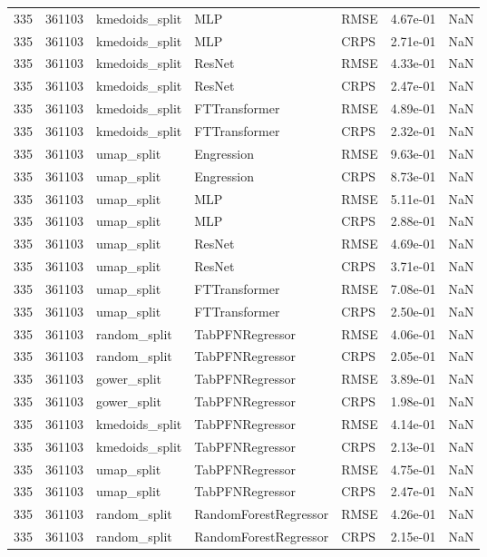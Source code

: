 \begin{tabular}{rrlllrr}
335 & 361103 & kmedoids\_split & MLP & RMSE & 4.67e-01 & NaN \\
335 & 361103 & kmedoids\_split & MLP & CRPS & 2.71e-01 & NaN \\
335 & 361103 & kmedoids\_split & ResNet & RMSE & 4.33e-01 & NaN \\
335 & 361103 & kmedoids\_split & ResNet & CRPS & 2.47e-01 & NaN \\
335 & 361103 & kmedoids\_split & FTTransformer & RMSE & 4.89e-01 & NaN \\
335 & 361103 & kmedoids\_split & FTTransformer & CRPS & 2.32e-01 & NaN \\
335 & 361103 & umap\_split & Engression & RMSE & 9.63e-01 & NaN \\
335 & 361103 & umap\_split & Engression & CRPS & 8.73e-01 & NaN \\
335 & 361103 & umap\_split & MLP & RMSE & 5.11e-01 & NaN \\
335 & 361103 & umap\_split & MLP & CRPS & 2.88e-01 & NaN \\
335 & 361103 & umap\_split & ResNet & RMSE & 4.69e-01 & NaN \\
335 & 361103 & umap\_split & ResNet & CRPS & 3.71e-01 & NaN \\
335 & 361103 & umap\_split & FTTransformer & RMSE & 7.08e-01 & NaN \\
335 & 361103 & umap\_split & FTTransformer & CRPS & 2.50e-01 & NaN \\
335 & 361103 & random\_split & TabPFNRegressor & RMSE & 4.06e-01 & NaN \\
335 & 361103 & random\_split & TabPFNRegressor & CRPS & 2.05e-01 & NaN \\
335 & 361103 & gower\_split & TabPFNRegressor & RMSE & 3.89e-01 & NaN \\
335 & 361103 & gower\_split & TabPFNRegressor & CRPS & 1.98e-01 & NaN \\
335 & 361103 & kmedoids\_split & TabPFNRegressor & RMSE & 4.14e-01 & NaN \\
335 & 361103 & kmedoids\_split & TabPFNRegressor & CRPS & 2.13e-01 & NaN \\
335 & 361103 & umap\_split & TabPFNRegressor & RMSE & 4.75e-01 & NaN \\
335 & 361103 & umap\_split & TabPFNRegressor & CRPS & 2.47e-01 & NaN \\
335 & 361103 & random\_split & RandomForestRegressor & RMSE & 4.26e-01 & NaN \\
335 & 361103 & random\_split & RandomForestRegressor & CRPS & 2.15e-01 & NaN \\

\end{tabular}

